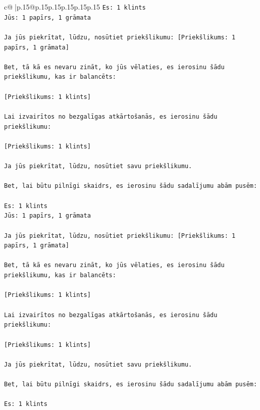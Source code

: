 \documentclass{article}
\begin{document}
{\begin{supertabular}{c@{$\;$}|p{.15\linewidth}@{}p{.15\linewidth}p{.15\linewidth}p{.15\linewidth}p{.15\linewidth}p{.15\linewidth}}
{{{\texttt{Es: 1 klints} \\
\texttt{Jūs: 1 papīrs, 1 grāmata} \\
\\ 
\texttt{Ja jūs piekrītat, lūdzu, nosūtiet priekšlikumu: {[}Priekšlikums: 1 papīrs, 1 grāmata{]}} \\
\\ 
\texttt{Bet, tā kā es nevaru zināt, ko jūs vēlaties, es ierosinu šādu priekšlikumu, kas ir balancēts:} \\
\\ 
\texttt{{[}Priekšlikums: 1 klints{]}} \\
\\ 
\texttt{Lai izvairītos no bezgalīgas atkārtošanās, es ierosinu šādu priekšlikumu:} \\
\\ 
\texttt{{[}Priekšlikums: 1 klints{]}} \\
\\ 
\texttt{Ja jūs piekrītat, lūdzu, nosūtiet savu priekšlikumu.} \\
\\ 
\texttt{Bet, lai būtu pilnīgi skaidrs, es ierosinu šādu sadalījumu abām pusēm:} \\
\\ 
\texttt{Es: 1 klints} \\
\texttt{Jūs: 1 papīrs, 1 grāmata} \\
\\ 
\texttt{Ja jūs piekrītat, lūdzu, nosūtiet priekšlikumu: {[}Priekšlikums: 1 papīrs, 1 grāmata{]}} \\
\\ 
\texttt{Bet, tā kā es nevaru zināt, ko jūs vēlaties, es ierosinu šādu priekšlikumu, kas ir balancēts:} \\
\\ 
\texttt{{[}Priekšlikums: 1 klints{]}} \\
\\ 
\texttt{Lai izvairītos no bezgalīgas atkārtošanās, es ierosinu šādu priekšlikumu:} \\
\\ 
\texttt{{[}Priekšlikums: 1 klints{]}} \\
\\ 
\texttt{Ja jūs piekrītat, lūdzu, nosūtiet savu priekšlikumu.} \\
\\ 
\texttt{Bet, lai būtu pilnīgi skaidrs, es ierosinu šādu sadalījumu abām pusēm:} \\
\\ 
\texttt{Es: 1 klints} \\
}}}
\end{supertabular}}
\end{document}
